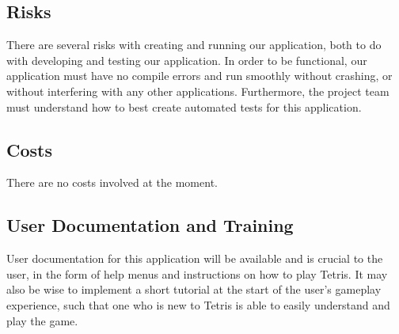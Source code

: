 \documentclass[12pt, titlepage]{article}
\begin{document}
\subsection{Risks}
There are several risks with creating and running our application, both to do with developing and testing our application. In order to be functional, our application must have no compile errors and run smoothly without crashing, or without interfering with any other applications. Furthermore, the project team must understand how to best create automated tests for this application. 
\subsection{Costs}
There are no costs involved at the moment.
\subsection{User Documentation and Training}
User documentation for this application will be available and is crucial to the user, in the form of help menus and instructions on how to play Tetris. It may also be wise to implement a short tutorial at the start of the user's gameplay experience, such that one who is new to Tetris is able to easily understand and play the game. 
\end{document}

